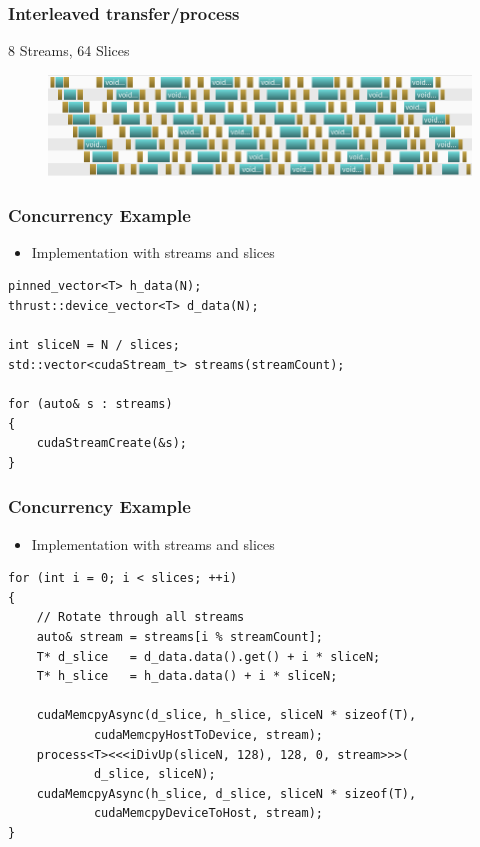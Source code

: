 \documentclass[aspectratio=169,handout]{beamer}
\begin{document}
\begin{frame}[fragile]
\frametitle{Interleaved transfer/process}
8 Streams, 64 Slices
\begin{figure}
	\includegraphics[width=.95\linewidth]{async648}
\end{figure}

\end{frame}




\begin{frame}[fragile]
\frametitle{Concurrency Example}
\begin{itemize}
	\item Implementation with streams and slices
\end{itemize}

\begin{lstlisting}
pinned_vector<T> h_data(N);
thrust::device_vector<T> d_data(N);

int sliceN = N / slices;
std::vector<cudaStream_t> streams(streamCount);

for (auto& s : streams)
{
    cudaStreamCreate(&s);
}
\end{lstlisting}
\end{frame}


\begin{frame}[fragile]
\frametitle{Concurrency Example}
\begin{itemize}
	\item Implementation with streams and slices
\end{itemize}

\begin{lstlisting}
for (int i = 0; i < slices; ++i)
{
    // Rotate through all streams
    auto& stream = streams[i % streamCount];
    T* d_slice   = d_data.data().get() + i * sliceN;
    T* h_slice   = h_data.data() + i * sliceN;

    cudaMemcpyAsync(d_slice, h_slice, sliceN * sizeof(T), 
    		cudaMemcpyHostToDevice, stream);
    process<T><<<iDivUp(sliceN, 128), 128, 0, stream>>>(
    		d_slice, sliceN);
    cudaMemcpyAsync(h_slice, d_slice, sliceN * sizeof(T), 
    		cudaMemcpyDeviceToHost, stream);
}
\end{lstlisting}
\end{frame}
\end{document}
